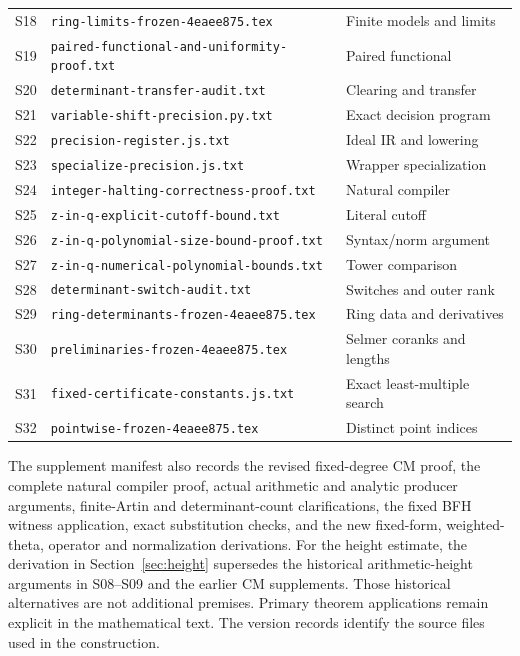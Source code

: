 \documentclass[11pt]{article}
\theoremstyle{definition}
\theoremstyle{remark}
\begin{document}
\begin{longtable}{p{}p{}p{}}
S18 & \texttt{ring-limits-frozen-4eaee875.tex} & Finite models and limits\\
S19 & \texttt{paired-functional-and-uniformity-proof.txt} & Paired functional\\
S20 & \texttt{determinant-transfer-audit.txt} & Clearing and transfer\\
S21 & \texttt{variable-shift-precision.py.txt} & Exact decision program\\
S22 & \texttt{precision-register.js.txt} & Ideal IR and lowering\\
S23 & \texttt{specialize-precision.js.txt} & Wrapper specialization\\
S24 & \texttt{integer-halting-correctness-proof.txt} & Natural compiler\\
S25 & \texttt{z-in-q-explicit-cutoff-bound.txt} & Literal cutoff\\
S26 & \texttt{z-in-q-polynomial-size-bound-proof.txt} & Syntax/norm argument\\
S27 & \texttt{z-in-q-numerical-polynomial-bounds.txt} & Tower comparison\\
S28 & \texttt{determinant-switch-audit.txt} & Switches and outer rank\\
S29 & \texttt{ring-determinants-frozen-4eaee875.tex} & Ring data and derivatives\\
S30 & \texttt{preliminaries-frozen-4eaee875.tex} & Selmer coranks and lengths\\
S31 & \texttt{fixed-certificate-constants.js.txt} & Exact least-multiple search\\
S32 & \texttt{pointwise-frozen-4eaee875.tex} & Distinct point indices\\
\bottomrule
\end{longtable}
The supplement manifest also records the revised fixed-degree CM proof,
the complete natural compiler proof, actual arithmetic and analytic
producer arguments, finite-Artin and determinant-count clarifications,
the fixed BFH witness application, exact substitution checks, and the
new fixed-form, weighted-theta, operator and normalization derivations.
For the height estimate, the derivation in Section~\ref{sec:height}
supersedes the historical arithmetic-height arguments in S08--S09 and
the earlier CM supplements. Those historical alternatives are not
additional premises. Primary theorem applications remain explicit in
the mathematical text.
The version records identify the source files used in the construction.

\end{document}
